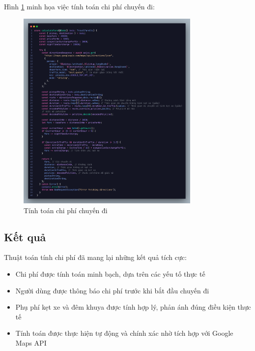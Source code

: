 \documentclass[../DoAn.tex]{subfiles}
\begin{document}
Hình \ref{fig:Tinh_toan_chi_phi} minh họa việc tính toán chi phí chuyến đi:
\begin{figure}[H]
  \centering
  \includegraphics[width=0.8\textwidth]{Hinhve/Tinh_toan_chi_phi.png}
  \caption{Tính toán chi phí chuyến đi}
  \label{fig:Tinh_toan_chi_phi}
\end{figure}

\subsection{Kết quả}
\label{subsection:5.4.3}
Thuật toán tính chi phí đã mang lại những kết quả tích cực:
\begin{itemize}
  \item Chi phí được tính toán minh bạch, dựa trên các yếu tố thực tế
  \item Người dùng được thông báo chi phí trước khi bắt đầu chuyến đi
  \item Phụ phí kẹt xe và đêm khuya được tính hợp lý, phản ánh đúng điều kiện thực tế
  \item Tính toán được thực hiện tự động và chính xác nhờ tích hợp với Google Maps API
\end{itemize}
\end{document}
